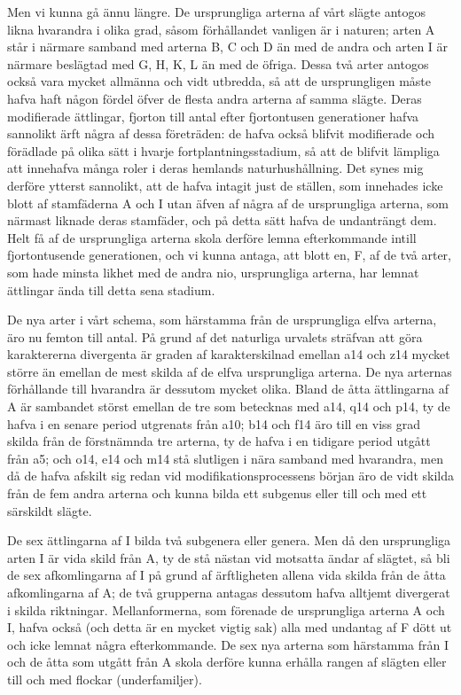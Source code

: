 Men vi kunna gå ännu längre. De ursprungliga arterna af vårt slägte antogos likna hvarandra i olika grad, såsom förhållandet vanligen är i naturen; arten A står i närmare samband med arterna B, C och D än med de andra och arten I är närmare beslägtad med G, H, K, L än med de öfriga. Dessa två arter antogos också vara mycket allmänna och vidt utbredda, så att de ursprungligen måste hafva haft någon fördel öfver de flesta andra arterna af samma slägte. Deras modifierade ättlingar, fjorton till antal efter fjortontusen generationer hafva sannolikt ärft några af dessa företräden: de hafva också blifvit modifierade och förädlade på olika sätt i hvarje fortplantningsstadium, så att de blifvit lämpliga att innehafva många roler i deras hemlands naturhushållning. Det synes mig derföre ytterst sannolikt, att de hafva intagit just de ställen, som innehades icke blott af stamfäderna A och I utan äfven af några af de ursprungliga arterna, som närmast liknade deras stamfäder, och på detta sätt hafva de undanträngt dem. Helt få af de ursprungliga arterna skola derföre lemna efterkommande intill fjortontusende generationen, och vi kunna antaga, att blott en, F, af de två arter, som hade minsta likhet med de andra nio, ursprungliga arterna, har lemnat ättlingar ända till detta sena stadium.

De nya arter i vårt schema, som härstamma från de ursprungliga elfva arterna, äro nu femton till antal. På grund af det naturliga urvalets sträfvan att göra karaktererna divergenta är graden af karakterskilnad emellan a14 och z14 mycket större än emellan de mest skilda af de elfva ursprungliga arterna. De nya arternas förhållande till hvarandra är dessutom mycket olika. Bland de åtta ättlingarna af A är sambandet störst emellan de tre som betecknas med a14, q14 och p14, ty de hafva i en senare period utgrenats från a10; b14 och f14 äro till en viss grad skilda från de förstnämnda tre arterna, ty de hafva i en tidigare period utgått från a5; och o14, e14 och m14 stå slutligen i nära samband med hvarandra, men då de hafva afskilt sig redan vid modifikationsprocessens början äro de vidt skilda från de fem andra arterna och kunna bilda ett subgenus eller till och med ett särskildt slägte.

De sex ättlingarna af I bilda två subgenera eller genera. Men då den ursprungliga arten I är vida skild från A, ty de stå nästan vid motsatta ändar af slägtet, så bli de sex afkomlingarna af I på grund af ärftligheten allena vida skilda från de åtta afkomlingarna af A; de två grupperna antagas dessutom hafva alltjemt divergerat i skilda riktningar. Mellanformerna, som förenade de ursprungliga arterna A och I, hafva också (och detta är en mycket vigtig sak) alla med undantag af F dött ut och icke lemnat några efterkommande. De sex nya arterna som härstamma från I och de åtta som utgått från A skola derföre kunna erhålla rangen af slägten eller till och med flockar (underfamiljer).

